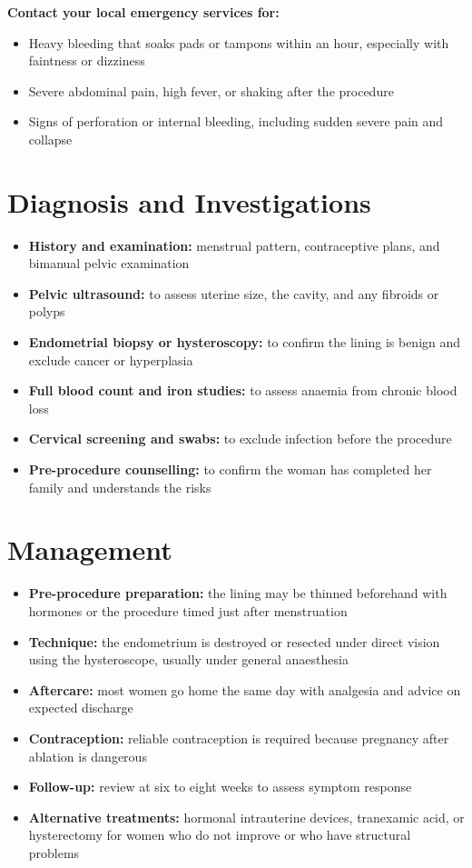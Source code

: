 \textbf{Contact your local emergency services for:}
\begin{itemize}
    \item Heavy bleeding that soaks pads or tampons within an hour, especially with faintness or dizziness
    \item Severe abdominal pain, high fever, or shaking after the procedure
    \item Signs of perforation or internal bleeding, including sudden severe pain and collapse
\end{itemize}

\section*{Diagnosis and Investigations}
\begin{itemize}
    \item \textbf{History and examination:} menstrual pattern, contraceptive plans, and bimanual pelvic examination
    \item \textbf{Pelvic ultrasound:} to assess uterine size, the cavity, and any fibroids or polyps
    \item \textbf{Endometrial biopsy or hysteroscopy:} to confirm the lining is benign and exclude cancer or hyperplasia
    \item \textbf{Full blood count and iron studies:} to assess anaemia from chronic blood loss
    \item \textbf{Cervical screening and swabs:} to exclude infection before the procedure
    \item \textbf{Pre-procedure counselling:} to confirm the woman has completed her family and understands the risks
\end{itemize}

\section*{Management}
\begin{itemize}
    \item \textbf{Pre-procedure preparation:} the lining may be thinned beforehand with hormones or the procedure timed just after menstruation
    \item \textbf{Technique:} the endometrium is destroyed or resected under direct vision using the hysteroscope, usually under general anaesthesia
    \item \textbf{Aftercare:} most women go home the same day with analgesia and advice on expected discharge
    \item \textbf{Contraception:} reliable contraception is required because pregnancy after ablation is dangerous
    \item \textbf{Follow-up:} review at six to eight weeks to assess symptom response
    \item \textbf{Alternative treatments:} hormonal intrauterine devices, tranexamic acid, or hysterectomy for women who do not improve or who have structural problems
\end{itemize}

